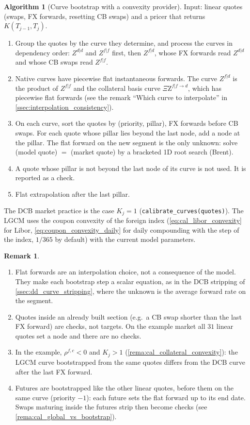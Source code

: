 \documentclass[11pt,english]{amsart}
\newcommand{\QZ}{{\Xi\mathrm{Z}}}
\theoremstyle{definition}
\newtheorem{rema}{Remark}
\newtheorem{algo}{Algorithm}
\begin{document}
\begin{algo}[Curve bootstrap with a convexity provider]\label{algo:cal_curve_bootstrap}
Input: linear quotes (swaps, FX forwards, resetting CB swaps) and a pricer that returns $K(T_{j-1},T_j)$.
\begin{enumerate}
\item Group the quotes by the curve they determine, and process the curves in dependency order: $Z^{d|d}$ and $Z^{f|f}$ first, then $Z^{f|d}$, whose FX forwards read $Z^{d|d}$ and whose CB swaps read $Z^{f|f}$.
\item Native curves have piecewise flat instantaneous forwards. The curve $Z^{f|d}$ is the product of $Z^{f|f}$ and the collateral basis curve $\QZ^{f|f\to d}$, which has piecewise flat forwards (see the remark ``Which curve to interpolate'' in \autoref{ssec:interpolation_consistency}).
\item On each curve, sort the quotes by (priority, pillar), FX forwards before CB swaps. For each quote whose pillar lies beyond the last node, add a node at the pillar. The flat forward on the new segment is the only unknown: solve (model quote) $=$ (market quote) by a bracketed 1D root search (Brent).
\item A quote whose pillar is not beyond the last node of its curve is not used. It is reported as a check.
\item Flat extrapolation after the last pillar.
\end{enumerate}
The DCB market practice is the case $K_j = 1$ (\texttt{calibrate\_curves(quotes)}). The LGCM uses the coupon convexity of the foreign index (\eqref{eq:cal_libor_convexity} for Libor, \eqref{eq:coupon_convexity_daily} for daily compounding with the step of the index, $1/365$ by default) with the current model parameters.
\end{algo}

\begin{rema}
\begin{enumerate}
\item Flat forwards are an interpolation choice, not a consequence of the model. They make each bootstrap step a scalar equation, as in the DCB stripping of \autoref{ssec:dd_curve_stripping}, where the unknown is the average forward rate on the segment.
\item Quotes inside an already built section (e.g.\ a CB swap shorter than the last FX forward) are checks, not targets. On the example market all $31$ linear quotes set a node and there are no checks.
\item In the example, $\rho^{f,c}<0$ and $K_j>1$ (\autoref{rema:cal_collateral_convexity}): the LGCM curve bootstrapped from the same quotes differs from the DCB curve after the last FX forward.
\item Futures are bootstrapped like the other linear quotes, before them on the same curve (priority $-1$): each future sets the flat forward up to its end date. Swaps maturing inside the futures strip then become checks (see \autoref{rema:cal_global_vs_bootstrap}).
\end{enumerate}
\end{rema}
\end{document}
